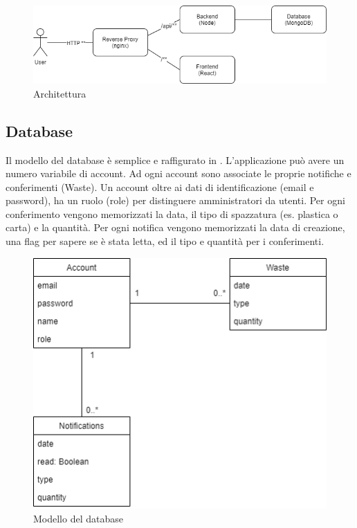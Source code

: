 \documentclass{report}
\begin{document}
\begin{figure}[h!]
\centering
\includegraphics[width=\textwidth]{arch}
\caption{Architettura}
\label{fig:arch}
\end{figure}

\subsection{Database}
Il modello del database è semplice e raffigurato in . L'applicazione può avere un numero variabile di account.
Ad ogni account sono associate le proprie notifiche e conferimenti (Waste). Un account oltre ai dati di identificazione
(email e password), ha un ruolo (role) per distinguere amministratori da utenti. Per ogni conferimento vengono memorizzati
la data, il tipo di spazzatura (es. plastica o carta) e la quantità. Per ogni notifica vengono memorizzati la data di creazione,
una flag per sapere se è stata letta, ed il tipo e quantità per i conferimenti.
\begin{figure}[h!]
    \centering
    \includegraphics[width=\textwidth]{db}
    \caption{Modello del database}
    \label{fig:db}
\end{figure}
\end{document}
